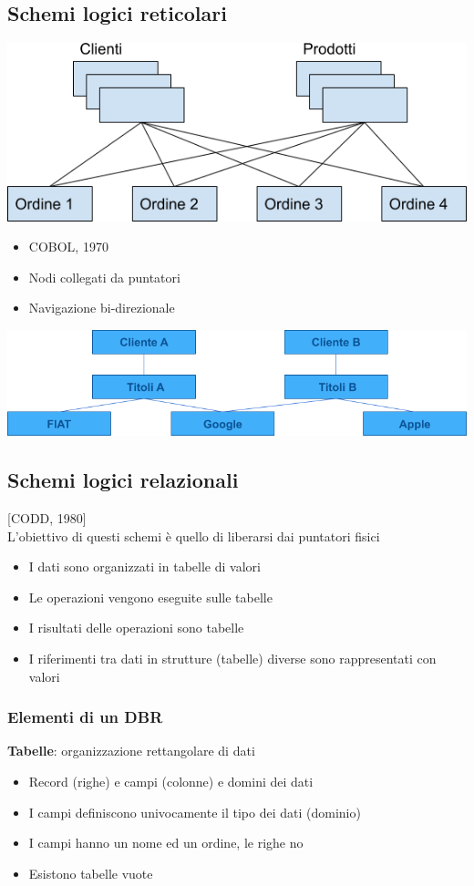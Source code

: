 \documentclass[12pt,a4paper]{article}
\begin{document}
\subsection{Schemi logici reticolari}
\begin{center}
\includegraphics[width=0.6\columnwidth]{img/reticolare.png}
\end{center}
\begin{itemize}
\item COBOL, 1970
\item Nodi collegati da puntatori
\item Navigazione bi-direzionale
\end{itemize}
\begin{center}
\includegraphics[width=0.6\columnwidth]{img/ridondanzaok.png}
\end{center}

\subsection{Schemi logici relazionali} 
[CODD, 1980]\\
L'obiettivo di questi schemi è quello di liberarsi dai puntatori fisici
\begin{itemize}
\item I dati sono organizzati in tabelle di valori
\item Le operazioni vengono eseguite sulle tabelle
\item I risultati delle operazioni sono tabelle
\item I riferimenti tra dati in strutture (tabelle) diverse sono rappresentati con valori
\end{itemize}

\subsubsection{Elementi di un DBR}
\textbf{Tabelle}: organizzazione rettangolare di dati
\begin{itemize}
\item Record (righe) e campi (colonne) e domini dei dati
\item I campi definiscono univocamente il tipo dei dati (dominio)
\item I campi hanno un nome ed un ordine, le righe no
\item Esistono tabelle vuote
\end{itemize}
\end{document}
